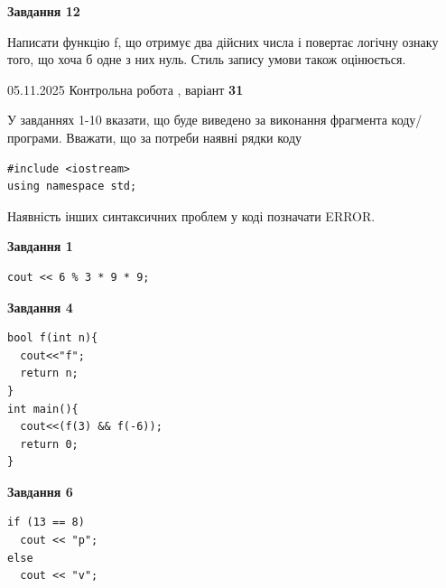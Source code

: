 \documentclass[12pt, ukrainian]{article}
\begin{document}
{\begin {large}
\begin{minipage}[t]{11.0cm}
\begin{center}
\textbf{Завдання 12}
\end{center}

Написати функцiю f, що отримує два дійсних числа і повертає логічну ознаку того, що хоча б одне з них нуль. Стиль запису умови також оцінюється.\par

\end{minipage}

\end {large}}
\newpage

{\Large{05.11.2025 Контрольна робота , варіант  \No \textbf { 31 }\par}}
{
\begin {large}
У завданнях 1-10 вказати, що буде виведено за виконання фрагмента коду/про\-гра\-ми.
Вважати, що за потреби наявні рядки коду
\begin{verbatim}
#include <iostream>
using namespace std;
\end{verbatim}
Наявність інших синтаксичних проблем у коді позначати ERROR.

\begin{minipage}[t]{7.0cm}

\begin{center}
\textbf{Завдання 1}
\end{center}
\vspace{-8mm}

\begin{verbatim}
cout << 6 % 3 * 9 * 9;
\end{verbatim}



\begin{center}
\textbf{Завдання 4}
\end{center}
\vspace{-8mm}

\begin{verbatim}
bool f(int n){
  cout<<"f";
  return n;
}
int main(){
  cout<<(f(3) && f(-6));
  return 0;
}
\end{verbatim}



\begin{center}
\textbf{Завдання 6}
\end{center}
\vspace{-8mm}

\begin{verbatim}
if (13 == 8)
  cout << "p";
else
  cout << "v";
\end{verbatim}




\end{minipage}
\end{large}}
\end{document}
